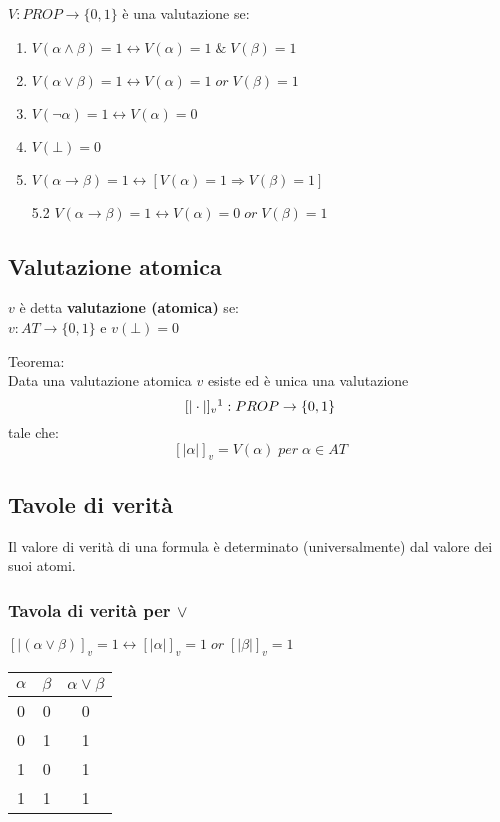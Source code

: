 \documentclass{article}
\theoremstyle{break}
\theoremstyle{break}
\theoremstyle{break}
\theoremstyle{break}
\begin{document}
\( V: PROP \to \{ 0, 1 \} \) è una valutazione se:
\begin{enumerate}
	\item \( V(\alpha \wedge \beta) = 1 \leftrightarrow V(\alpha) = 1\; \&\; V(\beta) = 1 \)
	\item \(V(\alpha \vee \beta) = 1 \leftrightarrow V(\alpha) = 1\; or\; V(\beta) = 1 \)
	\item \( V(\neg \alpha) = 1 \leftrightarrow V(\alpha) = 0 \)
	\item \( V(\bot) = 0 \)
	\item \( V(\alpha \to \beta) = 1 \leftrightarrow [ V(\alpha) = 1 \Rightarrow V(\beta) = 1] \)
	\item[5.2] \( V(\alpha \to \beta) = 1 \leftrightarrow V(\alpha) = 0\; or\; V(\beta) = 1  \)
\end{enumerate}

\subsection{Valutazione atomica}
\( v \) è detta \textbf{valutazione (atomica)} se:\\
\( v: AT \to \{0,1\}\) e \(v(\bot) = 0 \)

\begin{definition}
	Teorema:\\
	Data una valutazione atomica \( v \) esiste ed è unica una valutazione
	\[
		[| \cdot |]_v\footnote{\([| \cdot |]\) sono parentesi denotazionali, cioè
			indicano che stiamo valutando il valore della valutazione, quindi della semantica}: PROP \to \{0,1\}
	\] tale che:\[
		[| \alpha |]_v= V(\alpha) \; per\; \alpha \in AT
	\]
\end{definition}

\subsection{Tavole di verità}
Il valore di verità di una formula è determinato (universalmente) dal
valore dei suoi atomi.

\subsubsection{Tavola di verità per \( \vee \) }
\( [|(\alpha \vee \beta)]_v = 1 \leftrightarrow [|\alpha|]_v = 1\; or\; [|\beta|]_v = 1 \)
\begin{center}
	\begin{tabular}{c|c|c}
		\( \alpha \) & \( \beta \) & \( \alpha \vee \beta \) \\
		\hline
		0            & 0           & 0                       \\
		0            & 1           & 1                       \\
		1            & 0           & 1                       \\
		1            & 1           & 1                       \\
	\end{tabular}
\end{center}
\end{document}
